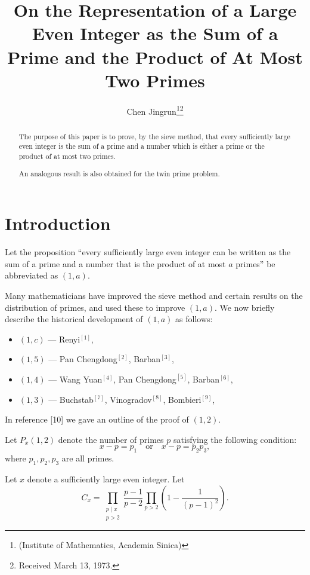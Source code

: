 \title{On the Representation of a Large Even Integer as the Sum of a Prime and the Product of At Most Two Primes}
\author{Chen Jingrun\thanks{(Institute of Mathematics, Academia Sinica)}\thanks{Received March 13, 1973.}}
\date{}
\maketitle

\begin{abstract}
The purpose of this paper is to prove, by the sieve method, that every sufficiently large even integer is the sum of a prime and a number which is either a prime or the product of at most two primes.

An analogous result is also obtained for the twin prime problem.
\end{abstract}

\section{Introduction}

Let the proposition ``every sufficiently large even integer can be written as the sum of a prime and a number that is the product of at most $a$ primes'' be abbreviated as $(1,a)$.

Many mathematicians have improved the sieve method and certain results on the distribution of primes, and used these to improve $(1,a)$. We now briefly describe the historical development of $(1,a)$ as follows:

\begin{itemize}[leftmargin=2em]
\item $(1,c)$ --- Renyi$^{[1]}$,
\item $(1,5)$ --- Pan Chengdong$^{[2]}$, Barban$^{[3]}$,
\item $(1,4)$ --- Wang Yuan$^{[4]}$, Pan Chengdong$^{[5]}$, Barban$^{[6]}$,
\item $(1,3)$ --- Buchstab$^{[7]}$, Vinogradov$^{[8]}$, Bombieri$^{[9]}$,
\end{itemize}
In reference [10] we gave an outline of the proof of $(1,2)$.

Let $P_x(1,2)$ denote the number of primes $p$ satisfying the following condition:
\[
x-p=p_1 \quad \text{or} \quad x-p=p_2p_3,
\]
where $p_1,p_2,p_3$ are all primes.

Let $x$ denote a sufficiently large even integer. Let
\[
C_x=\prod_{\substack{p\mid x\\ p>2}}\frac{p-1}{p-2}\prod_{p>2}\left(1-\frac{1}{(p-1)^2}\right).
\]


